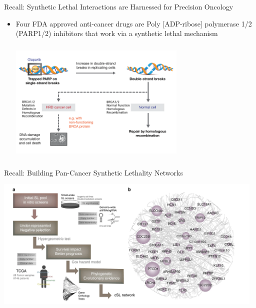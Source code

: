 \documentclass{beamer}
\begin{document}
	\begin{frame}{Recall: Synthetic Lethal Interactions are Harnessed for Precision Oncology}
		\begin{itemize} %
			\item \small Four FDA approved anti-cancer drugs  are Poly [ADP-ribose] polymerase 1/2 (PARP1/2) inhibitors that work via a synthetic lethal mechanism
			
			\centering
			\includegraphics[width=8.5cm, height=6cm]{olaparib2.png}
			
		\end{itemize}
		
	\end{frame}

	\begin{frame}{Recall: Building Pan-Cancer Synthetic Lethality Networks}
		\centering
		\includegraphics[width=13cm, height=7cm]{isle.png}
	\end{frame}
\end{document}
